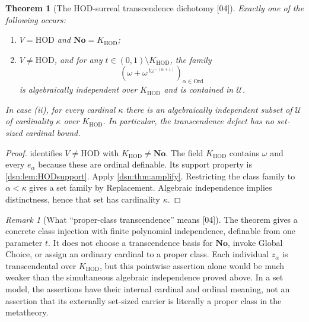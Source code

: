 \documentclass[11pt,a4paper]{article}
\numberwithin{equation}{section}
\newtheorem{theorem}{Theorem}[section]
\theoremstyle{definition}
\theoremstyle{remark}
\newtheorem{remark}[remark]{Remark}
\newcommand{\No}{\mathbf{No}}
\newcommand{\Ord}{\mathrm{Ord}}
\newcommand{\HOD}{\mathrm{HOD}}
\newcommand{\Cell}{\mathcal U}
\newcommand{\KH}{K_{\HOD}}
\newcommand{\src}[1]{\textup{\textsf{\small[#1]}}}
\begin{document}
\begin{theorem}[The HOD-surreal transcendence dichotomy \src{04}]
\label{dsn:thm:dichotomy}
Exactly one of the following occurs:
\begin{enumerate}[label=\textup{(\roman*)}]
\item $V=\HOD$ and $\No=\KH$;
\item $V\ne\HOD$, and for any $t\in(0,1)\setminus\KH$, the family
\[
 \left(\omega+\omega^{\,t\omega^{-(\alpha+1)}}\right)_{\alpha\in\Ord}
\]
is algebraically independent over $\KH$ and is contained in $\Cell$.
\end{enumerate}
In case \textup{(ii)}, for every cardinal $\kappa$ there is an
algebraically independent subset of $\Cell$ of cardinality $\kappa$
over $\KH$. In particular, the transcendence defect has no set-sized
cardinal bound.
\end{theorem}
\begin{proof}
 identifies $V\ne\HOD$ with $\KH\ne\No$. The field
$\KH$ contains $\omega$ and every $e_\alpha$ because these are ordinal
definable. Its support property is \cref{dsn:lem:HODsupport}. Apply
\cref{dsn:thm:amplify}. Restricting the class family to $\alpha<\kappa$
gives a set family by Replacement. Algebraic independence implies
distinctness, hence that set has cardinality $\kappa$.
\end{proof}

\begin{remark}[What ``proper-class transcendence'' means \src{04}]
The theorem gives a concrete class injection with finite polynomial
independence, definable from one parameter $t$. It does not choose a
transcendence basis for $\No$, invoke Global Choice, or assign an
ordinary cardinal to a proper class. Each individual $z_\alpha$ is
transcendental over $\KH$, but this pointwise assertion alone would
be much weaker than the simultaneous algebraic independence proved
above. In a set model, the assertions have their internal cardinal
and ordinal meaning, not an assertion that its externally set-sized
carrier is literally a proper class in the metatheory.
\end{remark}
\end{document}

